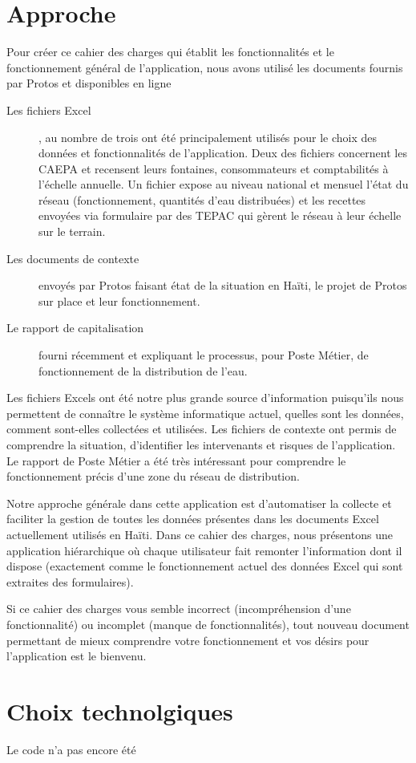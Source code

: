 \documentclass[a4paper, 11pt]{article}
\begin{document}
\section{Approche}
  Pour créer ce cahier des charges qui établit les fonctionnalités et le fonctionnement général de l'application, nous avons utilisé les documents fournis par Protos et disponibles en ligne
  \begin{description}
    \item[Les fichiers Excel], au nombre de trois ont été principalement utilisés pour le choix des données et fonctionnalités de l'application. Deux des fichiers concernent les CAEPA et recensent leurs fontaines, consommateurs et comptabilités à l'échelle annuelle. Un fichier expose au niveau national et mensuel l'état du réseau (fonctionnement, quantités d'eau distribuées) et les recettes envoyées via formulaire par des TEPAC qui gèrent le réseau à leur échelle sur le terrain.
    \item[Les documents de contexte] envoyés par Protos faisant état de la situation en Haïti, le projet de Protos sur place et leur fonctionnement.
    \item[Le rapport de capitalisation] fourni récemment et expliquant le processus, pour Poste Métier, de fonctionnement de la distribution de l'eau.
  \end{description}
  Les fichiers Excels ont été notre plus grande source d'information puisqu'ils nous permettent de connaître le système informatique actuel, quelles sont les données, comment sont-elles collectées et utilisées.
  Les fichiers de contexte ont permis de comprendre la situation, d'identifier les intervenants et risques de l'application.
  Le rapport de Poste Métier a été très intéressant pour comprendre le fonctionnement précis d'une zone du réseau de distribution.

  Notre approche générale dans cette application est d'automatiser la collecte et faciliter la gestion de toutes les données présentes dans les documents Excel actuellement utilisés en Haïti. Dans ce cahier des charges, nous présentons une application hiérarchique où chaque utilisateur fait remonter l'information dont il dispose (exactement comme le fonctionnement actuel des données Excel qui sont extraites des formulaires).

  \begin{shaded}
    Si ce cahier des charges vous semble incorrect (incompréhension d'une fonctionnalité) ou incomplet (manque de fonctionnalités), tout nouveau document permettant de mieux comprendre votre fonctionnement et vos désirs pour l'application est le bienvenu.
  \end{shaded}

\section{Choix technolgiques}
  Le code n'a pas encore été 
\end{document}
